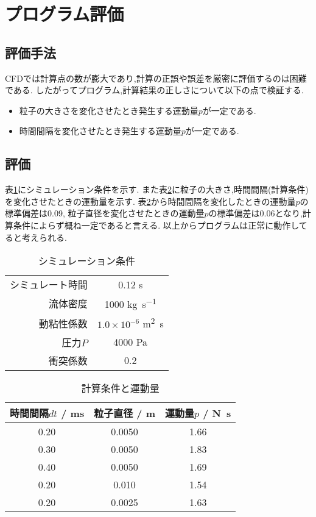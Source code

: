 \section{プログラム評価}
\subsection{評価手法}
\label{sec:eval}
CFDでは計算点の数が膨大であり,計算の正誤や誤差を厳密に評価するのは困難である.
したがってプログラム,計算結果の正しさについて以下の点で検証する.
\begin{itemize}
  \item 粒子の大きさを変化させたとき発生する運動量$p$が一定である.
  \item 時間間隔を変化させたとき発生する運動量$p$が一定である.
\end{itemize}
\subsection{評価}
表\ref{tab:eval_case}にシミュレーション条件を示す.
また表\ref{tab:eval_res}に粒子の大きさ,時間間隔(計算条件)を変化させたときの運動量を示す.
表\ref{tab:eval_res}から時間間隔を変化したときの運動量$p$の標準偏差は0.09,
粒子直径を変化させたときの運動量$p$の標準偏差は0.06となり,計算条件によらず概ね一定であると言える.
以上からプログラムは正常に動作してると考えられる.
\begin{table}[h]
\caption{シミュレーション条件}
\label{tab:eval_case}
\centering
\begin{tabular}{rc}
\hline
シミュレート時間&0.12 \si{\second}\\
流体密度&1000 \si{\kilo\gram.\second^{-1}}\\
動粘性係数&$1.0\times10^{-6}$ \si{\metre^2\second}\\
圧力$P$&4000 \si{\pascal}\\
衝突係数&0.2\\
\hline
\end{tabular}
\end{table}
\begin{table}[h]
\caption{計算条件と運動量}
\label{tab:eval_res}
\centering
\begin{tabular}{ccc}
\hline
時間間隔$dt$ / \si{\milli\second}&粒子直径 / \si{\metre}&運動量$p$ / \si{\newton.\second}\\
\hline \hline
0.20&0.0050&1.66\\
0.30&0.0050&1.83\\
0.40&0.0050&1.69\\
0.20&0.010&1.54\\
0.20&0.0025&1.63\\
\hline
\end{tabular}
\end{table}